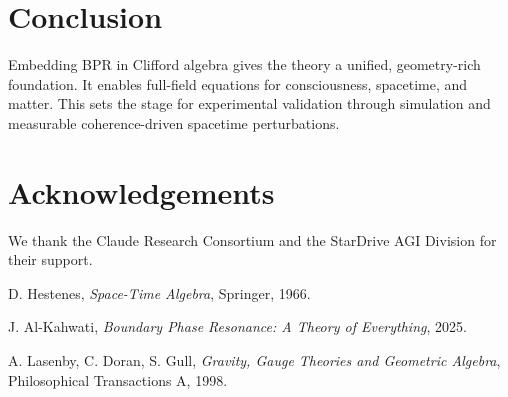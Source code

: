 \documentclass[12pt]{article}
\begin{document}
\section{Conclusion}

Embedding BPR in Clifford algebra gives the theory a unified, geometry-rich foundation. It enables full-field equations for consciousness, spacetime, and matter. This sets the stage for experimental validation through simulation and measurable coherence-driven spacetime perturbations.

\section*{Acknowledgements}
We thank the Claude Research Consortium and the StarDrive AGI Division for their support.


\begin{thebibliography}{9}

D. Hestenes, \textit{Space-Time Algebra}, Springer, 1966.

J. Al-Kahwati, \textit{Boundary Phase Resonance: A Theory of Everything}, 2025.

A. Lasenby, C. Doran, S. Gull, \textit{Gravity, Gauge Theories and Geometric Algebra}, Philosophical Transactions A, 1998.

\end{thebibliography}
\end{document}
